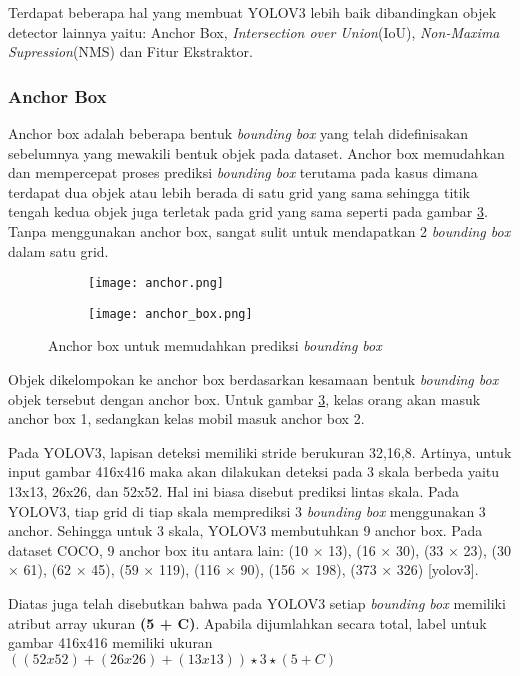 \documentclass[../thesis.tex]{subfiles}
\begin{document}
Terdapat beberapa hal yang membuat YOLOV3 lebih baik dibandingkan objek detector lainnya yaitu: Anchor Box, \textit{Intersection over Union}(IoU), \textit{Non-Maxima Supression}(NMS) dan Fitur Ekstraktor.
\subsubsection{Anchor Box}
Anchor box adalah beberapa bentuk \textit{bounding box} yang telah didefinisakan sebelumnya yang mewakili bentuk objek pada dataset. Anchor box memudahkan dan mempercepat proses prediksi \textit{bounding box} terutama pada kasus dimana terdapat dua objek atau lebih berada di satu grid yang sama sehingga titik tengah kedua objek juga terletak pada grid yang sama seperti pada gambar \ref{anchor_box_merge}. 
Tanpa menggunakan anchor box, sangat sulit untuk mendapatkan 2 \textit{bounding box} dalam satu grid.

\begin{figure}[htp]
	\centering
	\begin{subfigure}{0.4\textwidth}
	  \texttt{[image: anchor.png]}
	  \caption{}
	  \label{ancor}
	\end{subfigure}
	\begin{subfigure}{0.4\textwidth}
	  \texttt{[image: anchor\_box.png]}
	  \caption{}
	  \label{anchor_box}
	\end{subfigure}
	\caption{Anchor box untuk memudahkan prediksi \textit{bounding box}}
	\label{anchor_box_merge}
  \end{figure}

Objek dikelompokan ke anchor box berdasarkan kesamaan bentuk \textit{bounding box} objek tersebut dengan anchor box. Untuk gambar \ref{anchor_box_merge}, kelas orang akan masuk anchor box 1, sedangkan kelas mobil masuk anchor box 2.

Pada YOLOV3, lapisan deteksi memiliki stride berukuran 32,16,8. Artinya, untuk input gambar 416x416 maka akan dilakukan deteksi pada 3 skala berbeda yaitu 13x13, 26x26, dan 52x52. Hal ini biasa disebut prediksi lintas skala.
Pada YOLOV3, tiap grid di tiap skala memprediksi 3 \textit{bounding box} menggunakan 3 anchor. Sehingga untuk 3 skala, YOLOV3 membutuhkan 9 anchor box. Pada dataset COCO, 9 anchor box itu antara lain: (10 × 13), (16 × 30), (33 × 23), (30 × 61), (62 × 45), (59 ×
119), (116 × 90), (156 × 198), (373 × 326) [yolov3].

Diatas juga telah disebutkan bahwa pada YOLOV3 setiap \textit{bounding box} memiliki atribut array ukuran \textbf{(5 + C)}. Apabila dijumlahkan secara total, label untuk gambar 416x416 memiliki ukuran $((52x52)+(26x26)+(13x13))\star 3 \star (5+C)$
\end{document}
